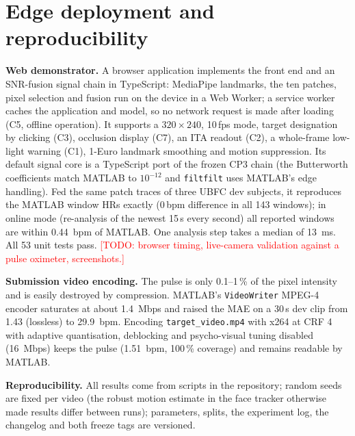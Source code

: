 \documentclass[conference]{IEEEtran}
\newcommand{\todo}[1]{\textcolor{red}{[TODO: #1]}}
\begin{document}
\section{Edge deployment and reproducibility}
\textbf{Web demonstrator.} A browser application implements the front end and an SNR-fusion signal chain in TypeScript:
MediaPipe landmarks, the ten patches, pixel selection and fusion run on the device in a Web Worker; a service worker caches
the application and model, so no network request is made after loading (C5, offline operation). It supports a
$320\times240$, 10\,fps mode, target designation by clicking (C3), occlusion display (C7), an ITA readout (C2), a whole-frame
low-light warning (C1), 1-Euro landmark smoothing and motion suppression. Its default signal core is a TypeScript port of the
frozen CP3 chain (the Butterworth coefficients match MATLAB to $10^{-12}$ and \texttt{filtfilt} uses MATLAB's edge handling).
Fed the same patch traces of three UBFC dev subjects, it reproduces the MATLAB window HRs exactly (0\,bpm difference in all 143
windows); in online mode (re-analysis of the newest 15\,s every second) all reported windows are within \SI{0.44}{bpm} of
MATLAB. One analysis step takes a median of \SI{13}{ms}. All 53 unit tests pass. \todo{browser timing, live-camera
validation against a pulse oximeter, screenshots.}

\textbf{Submission video encoding.} The pulse is only 0.1--1\,\% of the pixel intensity and is easily destroyed by
compression. MATLAB's \texttt{VideoWriter} MPEG-4 encoder saturates at about \SI{1.4}{Mbps} and raised the MAE on a
30\,s dev clip from 1.43 (lossless) to \SI{29.9}{bpm}. Encoding \texttt{target\_video.mp4} with x264 at CRF 4 with
adaptive quantisation, deblocking and psycho-visual tuning disabled (\SI{16}{Mbps}) keeps the pulse
(\SI{1.51}{bpm}, 100\,\% coverage) and remains readable by MATLAB.

\textbf{Reproducibility.} All results come from scripts in the repository; random seeds are fixed per video (the robust
motion estimate in the face tracker otherwise made results differ between runs); parameters, splits, the experiment log,
the changelog and both freeze tags are versioned.

\end{document}
